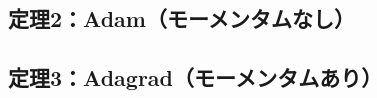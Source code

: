 \documentclass[dvipdfmx,a4paper,11pt]{jsarticle}
\begin{document}
\bigskip
\subsection{定理2：Adam（モーメンタムなし）}









\bigskip
\subsection{定理3：Adagrad（モーメンタムあり）}



\end{document}
